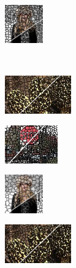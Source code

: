 \begin{figure}
\begin{subfigure}[b]{0.129\textwidth}
	\end{subfigure}
	\begin{subfigure}[b]{0.10\textwidth}
		\includegraphics[height=1.65cm]{pictures/fash/tp/cropped/tp_132_contours}
	\end{subfigure}\\
	\begin{subfigure}[b]{0.02\textwidth}
	\end{subfigure}
	\begin{subfigure}[b]{0.16\textwidth}
		\includegraphics[height=1.65cm]{pictures/bsds500/cis/cropped/cis_208078_contours}
	\end{subfigure}
	\begin{subfigure}[b]{0.129\textwidth}
		\includegraphics[height=1.65cm]{pictures/sbd/cis/cropped/cis_6000067_contours}
	\end{subfigure}
	\begin{subfigure}[b]{0.10\textwidth}
		\includegraphics[height=1.65cm]{pictures/fash/cis/cropped/cis_132_contours}
	\end{subfigure}
	\begin{subfigure}[b]{0.02\textwidth}
	\end{subfigure}
	\begin{subfigure}[b]{0.16\textwidth}
		\includegraphics[height=1.65cm]{pictures/bsds500/slic/cropped/slic_208078_contours}

\end{subfigure}
\end{figure}
